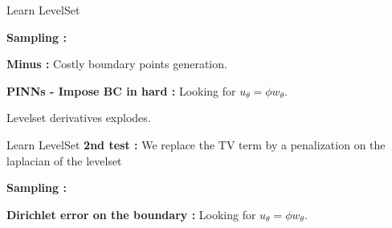 \begin{frame}{Learn LevelSet }	
	\begin{minipage}{0.26\linewidth}
		\textbf{Sampling :}
		\begin{center}
		\end{center}
	\end{minipage} \quad \begin{minipage}{0.70\linewidth}
		\centering
		
		\footnotesize\flushleft\vspace{-10pt}
		\qquad\qquad \textbf{Minus :} Costly boundary points generation.
	\end{minipage}
	
	\vspace{10pt}
	
	\textbf{PINNs - Impose BC in hard :} Looking for $u_\theta=\phi w_\theta$.
	\begin{center}
	\end{center}
	
	\vspace{-10pt}
	Levelset derivatives explodes.
\end{frame}

\begin{frame}{Learn LevelSet }
	\textbf{2nd test :} We replace the TV term by a penalization on the laplacian of the levelset

	\begin{center}
	\end{center}

	\begin{minipage}{0.28\linewidth}
		\centering
		\textbf{Sampling :}
		
	\end{minipage} \quad \begin{minipage}{0.68\linewidth}
		\centering
		\textbf{Dirichlet error on the boundary :} Looking for $u_\theta=\phi w_\theta$.
		
	\end{minipage}


\end{frame}

